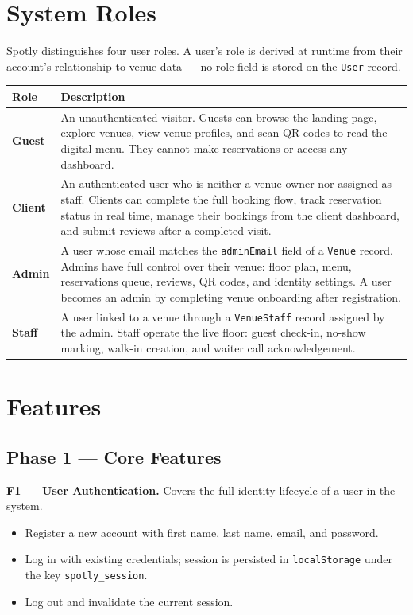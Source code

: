 \documentclass[12pt,a4paper,oneside]{report}
\begin{document}
\section{System Roles}

Spotly distinguishes four user roles. A user's role is derived at runtime
from their account's relationship to venue data --- no role field is stored on
the \texttt{User} record.

\begin{tabularx}{\linewidth}{>{\bfseries}lX}
  \toprule
  Role & Description \\
  \midrule
  Guest &
    An unauthenticated visitor. Guests can browse the landing page, explore
    venues, view venue profiles, and scan QR codes to read the digital menu.
    They cannot make reservations or access any dashboard. \\
  \addlinespace
  Client &
    An authenticated user who is neither a venue owner nor assigned as staff.
    Clients can complete the full booking flow, track reservation status in
    real time, manage their bookings from the client dashboard, and submit
    reviews after a completed visit. \\
  \addlinespace
  Admin &
    A user whose email matches the \texttt{adminEmail} field of a
    \texttt{Venue} record. Admins have full control over their venue:
    floor plan, menu, reservations queue, reviews, QR codes, and identity
    settings. A user becomes an admin by completing venue onboarding after
    registration. \\
  \addlinespace
  Staff &
    A user linked to a venue through a \texttt{VenueStaff} record assigned
    by the admin. Staff operate the live floor: guest check-in, no-show
    marking, walk-in creation, and waiter call acknowledgement. \\
  \bottomrule
\end{tabularx}

\section{Features}

\subsection{Phase 1 --- Core Features}

\textbf{F1 --- User Authentication.}
Covers the full identity lifecycle of a user in the system.
\begin{itemize}[leftmargin=1.5em, topsep=2pt, itemsep=1pt]
  \item Register a new account with first name, last name, email, and password.
  \item Log in with existing credentials; session is persisted in
        \texttt{localStorage} under the key \texttt{spotly\_session}.
  \item Log out and invalidate the current session.
\end{itemize}
\end{document}
